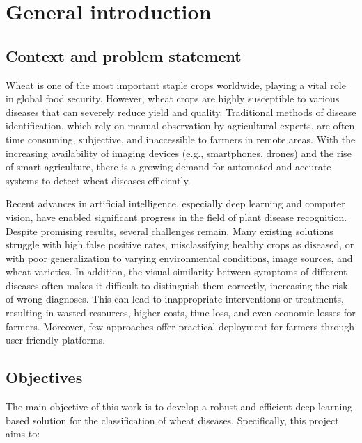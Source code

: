 \chapter*{General introduction}
\label{chap.intro}


\section*{Context and problem statement}

Wheat is one of the most important staple crops worldwide, playing a vital role in global food security. However, wheat crops are highly susceptible to various diseases that can severely reduce yield and quality. Traditional methods of disease identification, which rely on manual observation by agricultural experts, are often time consuming, subjective, and inaccessible to farmers in remote areas. With the increasing availability of imaging devices (e.g., smartphones, drones) and the rise of smart agriculture, there is a growing demand for automated and accurate systems to detect wheat diseases efficiently.

Recent advances in artificial intelligence, especially deep learning and computer vision, have enabled significant progress in the field of plant disease recognition. Despite promising results, several challenges remain. Many existing solutions struggle with high false positive rates, misclassifying healthy crops as diseased, or with poor generalization to varying environmental conditions, image sources, and wheat varieties. In addition, the visual similarity between symptoms of different diseases often makes it difficult to distinguish them correctly, increasing the risk of wrong diagnoses. This can lead to inappropriate interventions or treatments, resulting in wasted resources, higher costs, time loss, and even economic losses for farmers. Moreover, few approaches offer practical deployment for farmers through user friendly platforms.
\section*{Objectives}

The main objective of this work is to develop a robust and efficient deep learning-based solution for the classification of wheat diseases. Specifically, this project aims to:

